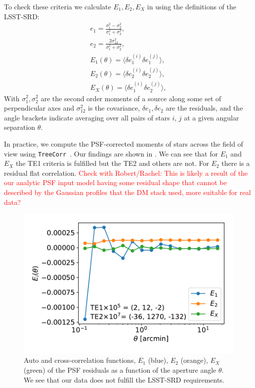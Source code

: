 \documentclass[twocolumn]{aastex62}
\begin{document}
To check these criteria we calculate $E_{1}, E_{2}, E_{X}$ in using the definitions of the LSST-SRD:
\begin{eqnarray}
e_{1} = \frac{\sigma^{2}_{1} - \sigma^{2}_{2}}{\sigma_{1}^{2}+\sigma_{2}^{2}},\\
e_{2} = \frac{2\sigma^{2}_{12}}{\sigma_{1}^{2}+\sigma_{2}^{2}},\\
E_{1} (\theta) = \langle \delta e^{(i)}_{1}\delta e^{(j)}_{1} \rangle,\\
E_{2} (\theta) = \langle \delta e^{(i)}_{2}\delta e^{(j)}_{2} \rangle,\\
E_{X} (\theta) = \langle \delta e^{(i)}_{1}\delta e^{(j)}_{2} \rangle,
\end{eqnarray}
With $\sigma_{1}^{2}, \sigma_{2}^{2}$ are the second order moments of a source along some set of perpendicular axes and $\sigma^{2}_{12}$ is the covariance, $\delta e_{1}, \delta e_{2}$ are the residuals, and the angle brackets indicate averaging over all pairs of stars $i$, $j$ at a given angular separation $\theta$.

In practice, we compute the PSF-corrected moments of stars across the field of view using \texttt{TreeCorr}~\citep{2004MNRAS.352..338J}. Our findings are shown in . We can see that for $E_{1}$ and $E_{X}$ the TE1 criteria is fulfilled but the TE2 and others are not. For $E_{2}$ there is a residual flat correlation. \textcolor{red}{Check with Robert/Rachel: This is likely a result of the our analytic PSF input model having some residual shape that cannot be described by the Gaussian profiles that the DM stack used, more suitable for real data?}
\begin{figure}
\centering
\includegraphics[width=0.9\columnwidth]{TEx}
\caption{Auto and cross-correlation functions, $E_{1}$ (blue), $E_{2}$ (orange), $E_{X}$ (green) of the PSF residuals as a function of the aperture angle $\theta$. We see that our data does not fulfill the LSST-SRD requirements.}
\label{fig:TEx}
\end{figure}
\end{document}
